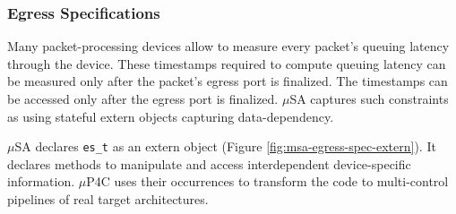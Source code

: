 
\subsubsection{Egress Specifications}
Many packet-processing devices allow to measure every packet's queuing latency through the device.
These timestamps required to compute queuing latency can be measured only after the packet's egress port is finalized.
The timestamps can be accessed only after the egress port is finalized.
$\mu$SA captures such constraints as using stateful extern objects capturing data-dependency.

$\mu$SA declares \texttt{es\_t} as an extern object (Figure \ref{fig:msa-egress-spec-extern}).
It declares methods to manipulate and access interdependent device-specific information.
$\mu$P4C uses their occurrences to transform the code to multi-control pipelines of real target architectures.







